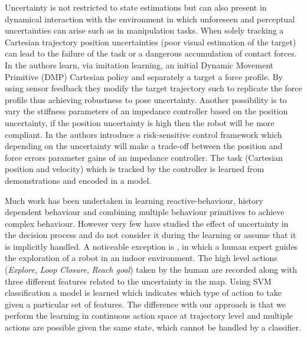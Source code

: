 Uncertainty is not restricted to state estimations but can also present in dynamical interaction with the environment in which 
unforeseen and perceptual uncertainties can arise such as in manipulation tasks. When solely tracking a Cartesian trajectory 
position uncertainties (poor visual estimation of the target) can lead to the failure of the task or a dangerous accumulation 
of contact forces. In \cite{online_pre_sensor_2011} the authors learn, via imitation learning, an initial 
Dynamic Movement Primitive (DMP) Cartesian policy and separately a target a force profile. By using sensor feedback they 
modify the target trajectory such to replicate the force profile thus achieving robustness to pose uncertainty. Another possibility
is to vary the stiffness parameters of an impedance controller \cite{Klas_icra_2012} based on the position uncertainty, 
if the position uncertainty is high then the robot will be more compliant. In \cite{MedinaSH13} the authors introduce a 
risk-sensitive control framework which depending on the uncertainty will make a trade-off between the position and force errors parameter gains
of an impedance controller. The task (Cartesian position and velocity) which is tracked by the controller is learned from demonstrations and encoded in 
a model.




Much work has been undertaken in learning reactive-behaviour, history dependent behaviour and combining multiple behaviour primitives to achieve
complex behaviour. However very few have studied the effect of uncertainty in the decision process and 
do not consider it during the learning or assume that it is implicitly handled.
A noticeable exception is \cite{GeorgiosLidoris}, in which a human expert guides the exploration of a robot in an indoor environment. 
The high level actions (\textit{Explore}, \textit{Loop Closure}, \textit{Reach goal}) taken by the human are recorded along with three different features related to the uncertainty in the map. 
Using SVM classification a model is learned which indicates which type of action to take given a particular set of 
features. The difference with our approach is that we perform 
the learning in continuous action space at trajectory level and multiple actions are possible given the same state, which cannot be handled by a classifier.

